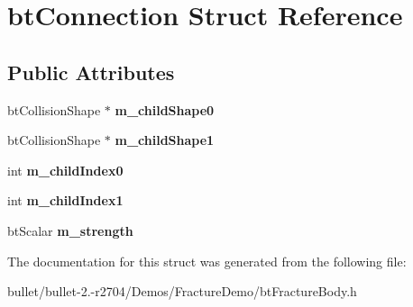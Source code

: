 \hypertarget{structbt_connection}{\section{bt\+Connection Struct Reference}
\label{structbt_connection}
}
\subsection*{Public Attributes}
\begin{DoxyCompactItemize}
\item 
\hypertarget{structbt_connection_a2acbcb89d60a66255d0111a3089c0864}{bt\+Collision\+Shape $\ast$ {\bfseries m\+\_\+child\+Shape0}}\label{structbt_connection_a2acbcb89d60a66255d0111a3089c0864}

\item 
\hypertarget{structbt_connection_a4258850ac6d0ad52deec70f349d66716}{bt\+Collision\+Shape $\ast$ {\bfseries m\+\_\+child\+Shape1}}\label{structbt_connection_a4258850ac6d0ad52deec70f349d66716}

\item 
\hypertarget{structbt_connection_a7c2de0a25e323767e9535e4be529f0f7}{int {\bfseries m\+\_\+child\+Index0}}\label{structbt_connection_a7c2de0a25e323767e9535e4be529f0f7}

\item 
\hypertarget{structbt_connection_a2262efb16cbb26990e9e4ba4176298ea}{int {\bfseries m\+\_\+child\+Index1}}\label{structbt_connection_a2262efb16cbb26990e9e4ba4176298ea}

\item 
\hypertarget{structbt_connection_aaeb63a8e952391a711664e88fda53c30}{bt\+Scalar {\bfseries m\+\_\+strength}}\label{structbt_connection_aaeb63a8e952391a711664e88fda53c30}

\end{DoxyCompactItemize}


The documentation for this struct was generated from the following file\+:\begin{DoxyCompactItemize}
\item 
bullet/bullet-\/2.-\/r2704/\+Demos/\+Fracture\+Demo/bt\+Fracture\+Body.\+h\end{DoxyCompactItemize}
